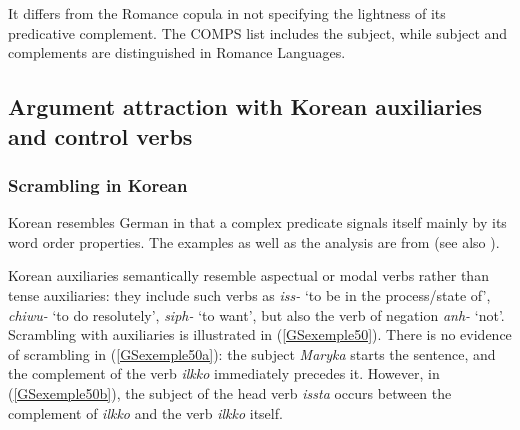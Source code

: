 \documentclass[output=paper
                ,modfonts
                ,nonflat
	        ,collection
	        ,collectionchapter
	        ,collectiontoclongg
 	        ,biblatex
                ,babelshorthands
                ,newtxmath
                ,draftmode
                ,colorlinks, citecolor=brown
]{./langsci/langscibook}
\begin{document}
{It differs from the Romance copula in not specifying the lightness of its predicative complement. The COMPS list includes the subject, while subject and complements are distinguished in Romance Languages.


\subsection{Argument attraction with Korean auxiliaries and control verbs}\label{GSsection4.2}

\subsubsection{Scrambling in Korean}\label{GSsection4.2.1}
 
Korean resembles German in that a complex predicate signals itself mainly by its word order properties. The examples as well as the analysis are from \cite{CC1998} (see also \citealt{Sells1991, Yoo2003, Kim2016a-u}).

Korean auxiliaries semantically resemble aspectual or modal verbs rather than tense auxiliaries: they include such verbs as \textit{iss-} `to be in the process/state of', \textit{chiwu-} `to do resolutely’, \textit{siph-} `to want', but also the verb of negation \textit{anh-} `not'. Scrambling with auxiliaries is illustrated in (\ref{GSexemple50}). There is no evidence of scrambling in (\ref{GSexemple50a}): the subject \textit{Maryka} starts the sentence, and the complement of the verb \textit{ilkko} immediately precedes it. However, in (\ref{GSexemple50b}), the subject of the head verb \textit{issta} occurs between the complement of \textit{ilkko} and the verb \textit{ilkko} itself. 

\begin{exe}
	\ex \label{GSexemple50} 
	\begin{xlist}
        \label{GSexemple50a}

        \label{GSexemple50b}
		   

\end{xlist}
\end{exe}}
\end{document}
